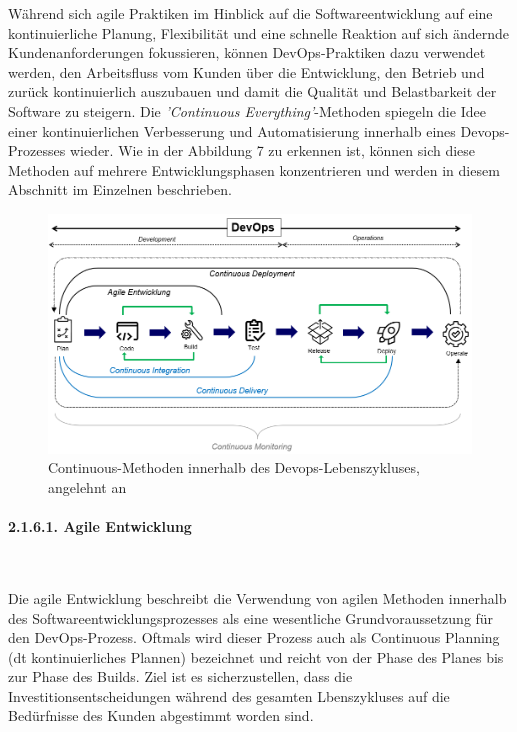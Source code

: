 Während sich agile Praktiken im Hinblick auf die Softwareentwicklung auf eine kontinuierliche Planung, Flexibilität und eine schnelle Reaktion auf sich ändernde Kundenanforderungen fokussieren, können DevOps-Praktiken dazu verwendet werden, den Arbeitsfluss vom Kunden über die Entwicklung, den Betrieb und zurück kontinuierlich auszubauen und damit die Qualität und Belastbarkeit der Software zu steigern. \cite{fitzgerald_continuous_2014} \cite[S. 264]{tokarski_strategische_2018} Die \textit{'Continuous Everything'}-Methoden spiegeln die Idee einer kontinuierlichen Verbesserung und Automatisierung innerhalb eines Devops-Prozesses wieder. Wie in der Abbildung 7 zu erkennen ist, können sich diese Methoden auf mehrere Entwicklungsphasen konzentrieren und werden in diesem Abschnitt im Einzelnen beschrieben.  

\begin{figure}[h]
    \centering
    \includegraphics[scale=0.5]{Bilder/Continuous Everything.png}
    \caption{Continuous-Methoden innerhalb des Devops-Lebenszykluses, angelehnt an \cite[S. 16]{halstenberg_devops_2020}}
\end{figure}

\paragraph{2.1.6.1. Agile Entwicklung} $~$

Die agile Entwicklung beschreibt die Verwendung von agilen Methoden innerhalb des Softwareentwicklungsprozesses als eine wesentliche Grundvoraussetzung für den DevOps-Prozess. Oftmals wird dieser Prozess auch als Continuous Planning (dt kontinuierliches Plannen) bezeichnet und reicht von der Phase des Planes bis zur Phase des Builds. \cite{fitzgerald_continuous_2014} Ziel ist es sicherzustellen, dass die Investitionsentscheidungen während des gesamten Lbenszykluses auf die Bedürfnisse des Kunden abgestimmt worden sind. 

